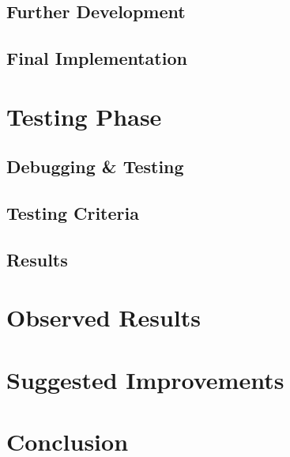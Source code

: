 \documentclass{article}
\begin{document}
\subsection{Further Development}
\subsection{Final Implementation}

\newpage
\section{Testing Phase}
\subsection{Debugging \& Testing}
\subsection{Testing Criteria}
\subsection{Results}

\newpage
\section{Observed Results}

\newpage
\section{Suggested Improvements}

\newpage
\section{Conclusion}

\newpage


\end{document}
